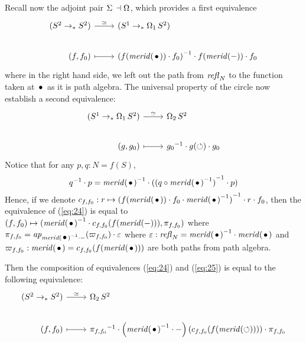 \documentclass[english,a4]{article}
\begin{document}
Recall now the adjoint pair $\operatorname{\Sigma}{}\dashv\operatorname{\Omega_{}}$, which
provides a first equivalence
\begin{equation}
  \label{eq:24}
  \begin{tikzcd}[%
    /tikz/column 1/.append style={anchor=base east},%
    /tikz/column 2/.append style={anchor=base west}]
    (\Sp \ptdto \Sp) \rar["\weq"] & (\Sc \ptdto \loopspace 1 \Sp)
    \\
    (f,f_0) \rar[mapsto] & \inv{\left(f(\mrd(\base)) \cdot
        f_0\right)}\cdot f(\mrd(\blank))\cdot f_0
  \end{tikzcd}
\end{equation}
where in the right hand side, we left out the path from $\mathop{{\mathit{refl}}_{N}}$ to
the function taken at $\base$ as it is path algebra. The universal
property of the circle now establish a second equivalence:
\begin{equation}
  \label{eq:25}
  \begin{tikzcd}[%
    /tikz/column 1/.append style={anchor=base east},%
    /tikz/column 2/.append style={anchor=base west}]
    (\Sc \ptdto \loopspace 1 \Sp) \rar["\weq"] & \loopspace 2 \Sp
    \\
    (g,g_0) \rar[mapsto] & \inv{g_0} \cdot g(\Sloop)\cdot g_0
  \end{tikzcd}
\end{equation}
Notice that for any $p,q:N=f(S)$,
\begin{equation}
  \inv{q} \cdot p = \inv{\mrd(\base)} \cdot (\inv{(q\circ \inv{\mrd(\base)})} \cdot p)
\end{equation}
Hence, if we denote
$c_{f,f_0}: r \mapsto \inv{(f(\mrd(\base))\cdot
  f_0\cdot\inv{\mrd(\base)})} \cdot r \cdot f_0$, then the equivalence
of (\ref{eq:24}) is equal to
$(f,f_0) \mapsto (\inv{\mrd(\base)}\cdot
c_{f,f_0}(f(\mrd(-))),\pi_{f,f_0})$ where
$\pi_{f,f_0} = \ap{\inv{\mrd(\base)}\cdot \blank}(\varpi_{f,f_0})
\cdot \varepsilon$ where
$\varepsilon: \refl N = \inv{\mrd(\base)}\cdot \mrd(\base)$ and
$\varpi_{f,f_0}:\mrd(\base) = c_{f,f_0}(f(\mrd(\base)))$ are both
paths from path algebra.

Then the composition of equivalences (\ref{eq:24}) and (\ref{eq:25})
is equal to the following equivalence:
\begin{equation}
  \begin{tikzcd}[%
    /tikz/column 1/.append style={anchor=base east},%
    /tikz/column 2/.append style={anchor=base west}]
    (\Sp \ptdto \Sp) \rar["\weq"] & \loopspace 2 \Sp
    \\
    (f,f_0) \rar[mapsto] & \inv{\pi_{f,f_0}} \cdot \left(
      \inv{\mrd(\base)} \cdot \blank \right)
    \left(c_{f,f_0}(f(\mrd(\Sloop)))\right) \cdot \pi_{f,f_0}
  \end{tikzcd}
\end{equation}
\end{document}
